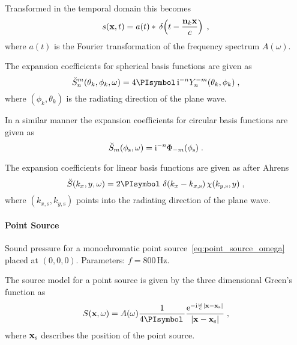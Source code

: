 Transformed in the temporal domain this becomes
%
\begin{equation}
    s(\x,t) = a(t) * \deltafunc{t -\frac{\n_k \x}{c}}
    \qc
    \label{eq:plane_wave_t}
\end{equation}
where $a(t)$ is the Fourier transformation of the frequency spectrum $A(\omega)$.

The expansion coefficients for spherical basis functions are given
as
%
\begin{equation}
    \breve{S}_n^m(\theta_k,\phi_k,\omega) = 4\PI \I^{-n} Y_n^{-m}(\theta_k,\phi_k)
    \qc
    \label{eq:plane_wave_spherical}
\end{equation}
%
where $(\phi_k,\theta_k)$ is the radiating direction of the plane wave.

In a similar manner the expansion coefficients for circular basis functions are
given as
%
\begin{equation}
    \breve{S}_m(\phi_\text{s},\omega) = \I^{-n} \Phi_{-m}(\phi_\text{s}) \qp
    \label{eq:plane_wave_circular}
\end{equation}
%

The expansion coefficients for linear basis functions are
given as after Ahrens
%
\begin{equation}
    \breve{S}(k_x,y,\omega) = 2\PI \deltafunc{k_x-k_{x,\text{s}}}
    \chi(k_{y,\text{s}},y)
    \qc
    \label{eq:plane_wave_linear}
\end{equation}
%
where $(k_{x,\text{s}},k_{y,\text{s}})$ points into the radiating direction of
the plane wave.


\paragraph{Point Source}
\label{sec:point_source}
%
\begin{marginfigure}
    \centering
    \ft
    
    \caption{Sound pressure for a monochromatic point
        source~\eqref{eq:point_source_omega} placed at $(0,0,0)$. Parameters: $f =
        800$\,Hz.
        }
\end{marginfigure}
%
The source model for a point source is given by the three dimensional Green's
function as
%
\begin{equation}
    S(\x,\omega) = A(\omega) \frac{1}{4\PI}
    \frac{\E^{-\I\omegac|\x-\xs|}}{|\x-\xs|}
    \qc
    \label{eq:point_source_omega}
\end{equation}
%
where $\mathbf{x}_\text{s}$ describes the position of the point source.

